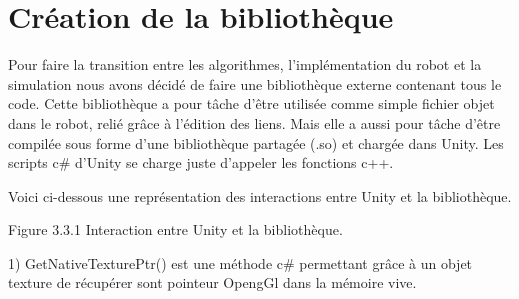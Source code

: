 \documentclass[12pt,a4paper]{report}
\begin{document}
\section{Création de la bibliothèque}
Pour faire la transition entre les algorithmes, l'implémentation du robot et la simulation nous avons décidé de faire une bibliothèque externe contenant tous le code.
Cette bibliothèque a pour tâche d'être utilisée comme simple fichier objet dans le robot, relié grâce à l'édition des liens. Mais elle a aussi pour tâche d'être compilée sous forme d'une bibliothèque partagée (.so) et chargée dans Unity. Les scripts c\# d'Unity se charge juste d'appeler les fonctions c++.

Voici ci-dessous une représentation des interactions entre Unity et la bibliothèque.
\begin{center}

Figure 3.3.1 Interaction entre Unity et la bibliothèque.\\
\end{center}
\begin{small}
1) GetNativeTexturePtr() est une méthode c\# permettant grâce à un objet texture de récupérer sont pointeur OpengGl dans la mémoire vive.
\end{small}
\end{document}
